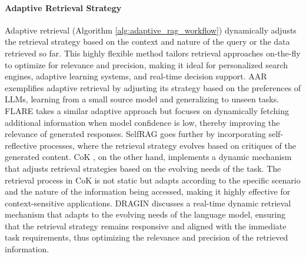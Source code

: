 \paragraph{Adaptive Retrieval Strategy} Adaptive retrieval (Algorithm \ref{alg:adaptive_rag_workflow}) dynamically adjusts the retrieval strategy based on the context and nature of the query or the data retrieved so far. This highly flexible method tailors retrieval approaches on-the-fly to optimize for relevance and precision, making it ideal for personalized search engines, adaptive learning systems, and real-time decision support. AAR  \cite{yu2023augmentationadapted} exemplifies adaptive retrieval by adjusting its strategy based on the preferences of LLMs, learning from a small source model and generalizing to unseen tasks. FLARE \cite{jiang2023active} takes a similar adaptive approach but focuses on dynamically fetching additional information when model confidence is low, thereby improving the relevance of generated responses. SelfRAG \cite{asai2024selfrag} goes further by incorporating self-reflective processes, where the retrieval strategy evolves based on critiques of the generated content. CoK \cite{li2024chainofknowledge}, on the other hand, implements a dynamic mechanism that adjusts retrieval strategies based on the evolving needs of the task. The retrieval process in CoK is not static but adapts according to the specific scenario and the nature of the information being accessed, making it highly effective for context-sensitive applications. DRAGIN \cite{su2024dragin} discusses a real-time dynamic retrieval mechanism that adapts to the evolving needs of the language model, ensuring that the retrieval strategy remains responsive and aligned with the immediate task requirements, thus optimizing the relevance and precision of the retrieved information. \\

